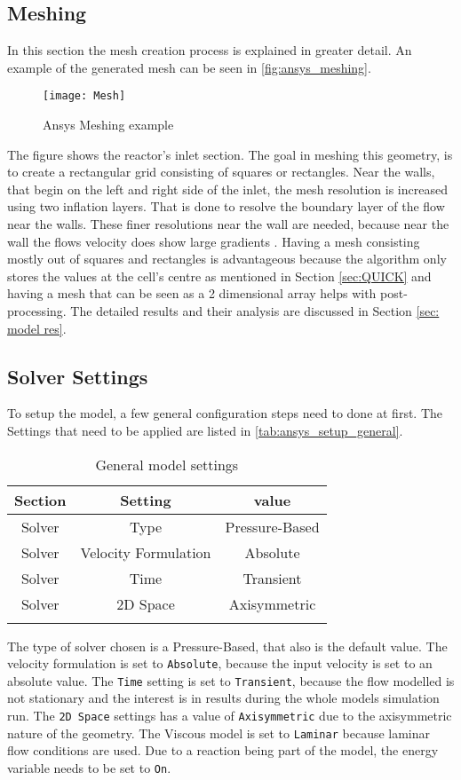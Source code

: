 \documentclass[../thesis.tex]{subfiles}
\begin{document}
\subsection{Meshing}
In this section the mesh creation process is explained in greater detail. An example of the generated mesh can be seen in \autoref{fig:ansys_meshing}.
\begin{figure}[htb]
	\centering
	\texttt{[image: Mesh]}
	\caption{Ansys Meshing example}
	\label{fig:ansys_meshing}
\end{figure}
The figure shows the reactor's inlet section. The goal in meshing this geometry, is to create a rectangular grid consisting of squares or rectangles. Near the walls, that begin on the left and right side of the inlet, the mesh resolution is increased using two inflation layers. That is done to resolve the boundary layer of the flow near the walls. These finer resolutions near the wall are needed, because near the wall the flows velocity does show large gradients \cite{versteeg2007introduction}. Having a mesh consisting mostly out of squares and rectangles is advantageous because the algorithm only stores the values at the cell's centre as mentioned in Section \ref{sec:QUICK} and having a mesh that can be seen as a 2 dimensional array helps with post-processing. The detailed results and their analysis are discussed in Section \ref{sec: model res}.

\subsection{Solver Settings}
\label{sec: setup}

To setup the model, a few general configuration steps need to done at first. The Settings that need to be applied are listed in \autoref{tab:ansys_setup_general}.

\begin{table} [htb]
	\centering
	\caption{General model settings}
	\begin{tabular}{ ccc }
		\hline
		Section & Setting & value \\
		\hline
		Solver & Type & Pressure-Based \\
		Solver & Velocity Formulation & Absolute  \\
		Solver & Time &  Transient  \\
		Solver & 2D Space & Axisymmetric \\
		\hline
		\label{tab:ansys_setup_general}
	\end{tabular}
\end{table}
The type of solver chosen is a Pressure-Based, that also is the default value. The velocity formulation is set to \texttt{Absolute}, because the input velocity is set to an absolute value. The \texttt{Time} setting is set to \texttt{Transient}, because the flow modelled is not stationary and the interest is in results during the whole models simulation run. The \texttt{2D Space} settings has a value of \texttt{Axisymmetric} due to the axisymmetric nature of the geometry. The Viscous model is set to \texttt{Laminar} because laminar flow conditions are used. Due to a reaction being part of the model, the energy variable needs to be set to \texttt{On}.
\end{document}
